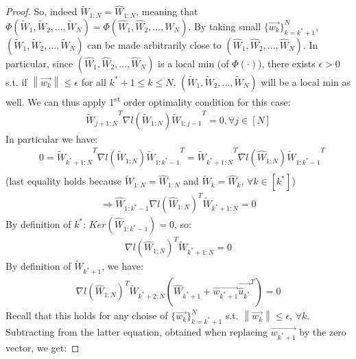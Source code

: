 \documentclass[12pt]{article}
\newcommand{\norm}[1]{\left\| #1 \right\|}
\begin{document}
\begin{proof}
	    So, indeed ${\widetilde{W}_{1:N}} = {\widehat{W}_{1:N}}$,
	    meaning that $\Phi({\widetilde{W}_1}, {\widetilde{W}_2}, ..., {\widetilde{W}_N}) = \Phi({\widehat{W}_1}, {\widehat{W}_2}, ..., {\widehat{W}_N})$.
	    By taking small $\{\overrightarrow{w_k}\}_{k=k^\ast+1}^N$, $({\widetilde{W}_1}, {\widetilde{W}_2}, ..., {\widetilde{W}_N})$ can be made arbitrarily close to $({\widehat{W}_1}, {\widehat{W}_2}, ..., {\widehat{W}_N})$.
	    In particular, since $({\widehat{W}_1}, {\widehat{W}_2}, ..., {\widehat{W}_N})$ is a local min (of $\Phi(\cdot)$), there exists $\epsilon > 0$ s.t. if $\norm{\overrightarrow{w_k}} \leq \epsilon$ for all $k^\ast + 1 \leq k \leq N$, $({\widetilde{W}_1}, {\widetilde{W}_2}, ..., {\widetilde{W}_N})$ will be a local min as well. We can thus apply 1\textsuperscript{st} order optimality condition for this case:
	    \begin{align*}
	        {\widetilde{W}_{j+1:N}}^T \nabla{l({\widetilde{W}_{1:N}})} {\widetilde{W}_{1:j-1}}^T = 0, \forall j \in [N]
	    \end{align*}
	    In particular we have:
	    \begin{align*}
	        & 0 = {\widetilde{W}_{k^\ast+1:N}}^T \nabla{l({\widetilde{W}_{1:N}})} {\widetilde{W}_{1:k^\ast-1}}^T = {\widetilde{W}_{k^\ast+1:N}}^T \nabla{l({\widehat{W}_{1:N}})} {\widetilde{W}_{1:k^\ast-1}}^T \\
	    \end{align*}
	    (last equality holds because ${\widetilde{W}_{1:N}} = {\widehat{W}_{1:N}}$ and ${\widetilde{W}_k} = {\widehat{W}_k}$, $\forall k \in [k^\ast]$)
	    \begin{align*}
	        \Longrightarrow {\widehat{W}_{1:k^\ast-1}} \nabla{l({\widehat{W}_{1:N}})}^T {\widetilde{W}_{k^\ast+1:N}} = 0
	    \end{align*}
	    By definition of $k^\ast$: $Ker({\widehat{W}_{1:k^\ast-1}}) = 0$, so:
	    \begin{align*}
	        \nabla{l({\widehat{W}_{1:N}})}^T {\widetilde{W}_{k^\ast+1:N}} = 0
	    \end{align*}
	    By definition of ${\widetilde{W}_{k^\ast+1}}$, we have:
	    \begin{align*}
	        \nabla{l({{\widehat{W}}_{1:N}})}^T {\widetilde{W}_{k^\ast+2:N}} ({\widehat{W}_{k^\ast + 1}} + \overrightarrow{w_{k^\ast+1}} {\overrightarrow{\widehat{u}_{k^\ast}}}^T) = 0
	    \end{align*}
	    Recall that this holds for any choise of $\{\overrightarrow{w_k}\}_{k=k^\ast+1}^N$ s.t. $\norm{\overrightarrow{w_k}} \leq \epsilon$, $\forall{k}$. Subtracting from the latter equation, obtained when replacing $\overrightarrow{w_{k^\ast+1}}$ by the zero vector, we get:

\end{proof}
\end{document}
